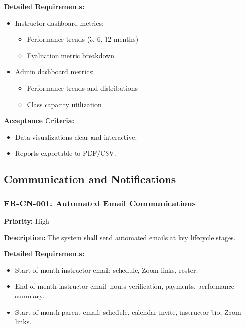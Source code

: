 \textbf{Detailed Requirements:}
\begin{itemize}
    \item Instructor dashboard metrics:
    \begin{itemize}
        \item Performance trends (3, 6, 12 months)
        \item Evaluation metric breakdown
    \end{itemize}
    \item Admin dashboard metrics:
    \begin{itemize}
        \item Performance trends and distributions
        \item Class capacity utilization
    \end{itemize}
\end{itemize}

\textbf{Acceptance Criteria:}
\begin{itemize}
    \item Data visualizations clear and interactive.
    \item Reports exportable to PDF/CSV.
\end{itemize}

\subsection{Communication and Notifications}

\subsubsection{FR-CN-001: Automated Email Communications}
\textbf{Priority:} High  

\textbf{Description:} The system shall send automated emails at key lifecycle stages.

\textbf{Detailed Requirements:}
\begin{itemize}
    \item Start-of-month instructor email: schedule, Zoom links, roster.
    \item End-of-month instructor email: hours verification, payments, performance summary.
    \item Start-of-month parent email: schedule, calendar invite, instructor bio, Zoom links.
\end{itemize}

